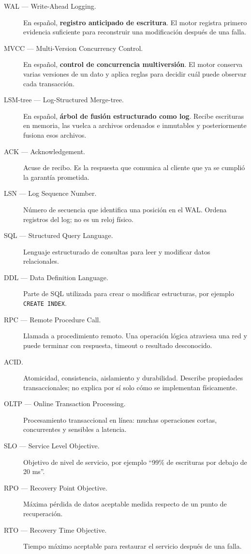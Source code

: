 \documentclass[variant=apuntes,cover=institutional,mode=screen]{ua-engineering-v6-article}
\begin{document}
\begin{description}
\item[WAL --- Write-Ahead Logging.] En español, \textbf{registro anticipado de escritura}. El motor registra primero evidencia suficiente para reconstruir una modificación después de una falla.

\item[MVCC --- Multi-Version Concurrency Control.] En español, \textbf{control de concurrencia multiversión}. El motor conserva varias versiones de un dato y aplica reglas para decidir cuál puede observar cada transacción.

\item[LSM-tree --- Log-Structured Merge-tree.] En español, \textbf{árbol de fusión estructurado como log}. Recibe escrituras en memoria, las vuelca a archivos ordenados e inmutables y posteriormente fusiona esos archivos.

\item[ACK --- Acknowledgement.] Acuse de recibo. Es la respuesta que comunica al cliente que ya se cumplió la garantía prometida.

\item[LSN --- Log Sequence Number.] Número de secuencia que identifica una posición en el WAL. Ordena registros del log; no es un reloj físico.

\item[SQL --- Structured Query Language.] Lenguaje estructurado de consultas para leer y modificar datos relacionales.

\item[DDL --- Data Definition Language.] Parte de SQL utilizada para crear o modificar estructuras, por ejemplo \texttt{CREATE INDEX}.

\item[RPC --- Remote Procedure Call.] Llamada a procedimiento remoto. Una operación lógica atraviesa una red y puede terminar con respuesta, timeout o resultado desconocido.

\item[ACID.] Atomicidad, consistencia, aislamiento y durabilidad. Describe propiedades transaccionales; no explica por sí solo cómo se implementan físicamente.

\item[OLTP --- Online Transaction Processing.] Procesamiento transaccional en línea: muchas operaciones cortas, concurrentes y sensibles a latencia.

\item[SLO --- Service Level Objective.] Objetivo de nivel de servicio, por ejemplo ``99\% de escrituras por debajo de 20 ms''.

\item[RPO --- Recovery Point Objective.] Máxima pérdida de datos aceptable medida respecto de un punto de recuperación.

\item[RTO --- Recovery Time Objective.] Tiempo máximo aceptable para restaurar el servicio después de una falla.
\end{description}
\end{document}
